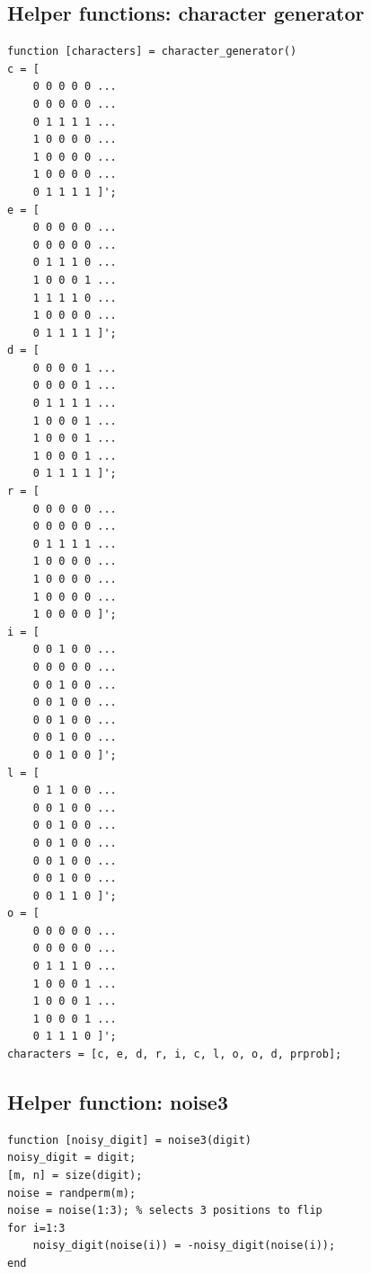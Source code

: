 \documentclass[11pt, a4paper]{article}
\begin{document}
\begin{appendices}
\subsection{Helper functions: character generator}
\begin{lstlisting}
function [characters] = character_generator()
c = [ 
    0 0 0 0 0 ...
    0 0 0 0 0 ...
    0 1 1 1 1 ...
    1 0 0 0 0 ...
    1 0 0 0 0 ...
    1 0 0 0 0 ...
    0 1 1 1 1 ]';
e = [
    0 0 0 0 0 ...
    0 0 0 0 0 ...
    0 1 1 1 0 ...
    1 0 0 0 1 ...
    1 1 1 1 0 ...
    1 0 0 0 0 ...
    0 1 1 1 1 ]';
d = [
    0 0 0 0 1 ...
    0 0 0 0 1 ...
    0 1 1 1 1 ...
    1 0 0 0 1 ...
    1 0 0 0 1 ...
    1 0 0 0 1 ...
    0 1 1 1 1 ]';
r = [ 
    0 0 0 0 0 ...
    0 0 0 0 0 ...
    0 1 1 1 1 ...
    1 0 0 0 0 ...
    1 0 0 0 0 ...
    1 0 0 0 0 ...
    1 0 0 0 0 ]';
i = [
    0 0 1 0 0 ...
    0 0 0 0 0 ...
    0 0 1 0 0 ...
    0 0 1 0 0 ...
    0 0 1 0 0 ...
    0 0 1 0 0 ...
    0 0 1 0 0 ]';
l = [
    0 1 1 0 0 ...
    0 0 1 0 0 ...
    0 0 1 0 0 ...
    0 0 1 0 0 ...
    0 0 1 0 0 ...
    0 0 1 0 0 ...
    0 0 1 1 0 ]';
o = [
    0 0 0 0 0 ...
    0 0 0 0 0 ...
    0 1 1 1 0 ...
    1 0 0 0 1 ...
    1 0 0 0 1 ...
    1 0 0 0 1 ...
    0 1 1 1 0 ]';   
characters = [c, e, d, r, i, c, l, o, o, d, prprob];
\end{lstlisting}
\subsection{Helper function: noise3}
\begin{lstlisting}
function [noisy_digit] = noise3(digit)
noisy_digit = digit;
[m, n] = size(digit);
noise = randperm(m);
noise = noise(1:3); % selects 3 positions to flip
for i=1:3
    noisy_digit(noise(i)) = -noisy_digit(noise(i));
end
\end{lstlisting}
\end{appendices}
\end{document}
